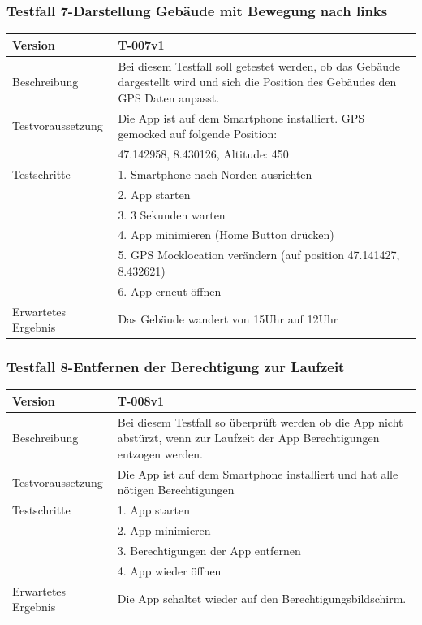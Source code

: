 \documentclass[a4paper]{scrreprt}
\begin{document}
\subsubsection{Testfall 7-Darstellung Gebäude mit Bewegung nach links}
\begin{tabularx}{\textwidth}{|l|X|}
\hline 
	Version &
	T-007v1 \\ 
\hline 
	Beschreibung & 
	Bei diesem Testfall soll getestet werden, ob das Gebäude dargestellt wird und sich die Position des Gebäudes den GPS Daten anpasst. \\ 
\hline 
	Testvoraussetzung &
	Die App ist auf dem Smartphone installiert. GPS gemocked auf folgende Position: \\ &
		47.142958, 8.430126, Altitude: 450 \\ 
\hline 
	Testschritte & 
		1. Smartphone nach Norden ausrichten \\ &
		2. App starten \\ &
		3. 3 Sekunden warten \\ &
4. App minimieren (Home Button drücken) \\ &
		5. GPS Mocklocation verändern (auf position  47.141427, 8.432621) \\ &
		6. App erneut öffnen \\
\hline
	Erwartetes Ergebnis &
	Das Gebäude wandert von 15Uhr auf 12Uhr \\ 
\hline 
\end{tabularx}
\subsubsection{Testfall 8-Entfernen der Berechtigung zur Laufzeit}
\begin{tabularx}{\textwidth}{|l|X|}
\hline 
	Version &
	T-008v1 \\ 
\hline 
	Beschreibung & 
	Bei diesem Testfall so überprüft werden ob die App nicht abstürzt, wenn zur Laufzeit der App Berechtigungen entzogen werden. \\ 
\hline 
	Testvoraussetzung &
	Die App ist auf dem Smartphone installiert und hat alle nötigen Berechtigungen \\ 
\hline 
	Testschritte & 
		1. App starten \\ &
		2. App minimieren \\ &
		3. Berechtigungen der App entfernen \\ &
		4. App wieder öffnen \\
\hline
	Erwartetes Ergebnis &
	Die App schaltet wieder auf den Berechtigungsbildschirm. \\ 
\hline 
\end{tabularx}
\end{document}
